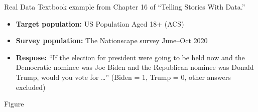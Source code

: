 
\begin{frame}{Real Data}
Textbook example from Chapter 16 of ``Telling Stories With Data.'' \citep{alexander:2023:telling}

\begin{itemize}
    \item \textbf{Target population:} US Population Aged 18+ (ACS) \citep{ipumsusa}
    \item \textbf{Survey population:} The Nationscape survey June--Oct 2020 \citep{tausanovitch:2019:democracy}
    \item \textbf{Respose:}  ``If
        the election for president were going to be held now and the Democratic
        nominee was Joe Biden and the Republican nominee was Donald Trump, would you
        vote for \ldots'' (Biden = 1, Trump = 0, other answers excluded)
\end{itemize}




\end{frame}

\begin{frame}{Figure}
\AlexanderBandFig{}
\end{frame}